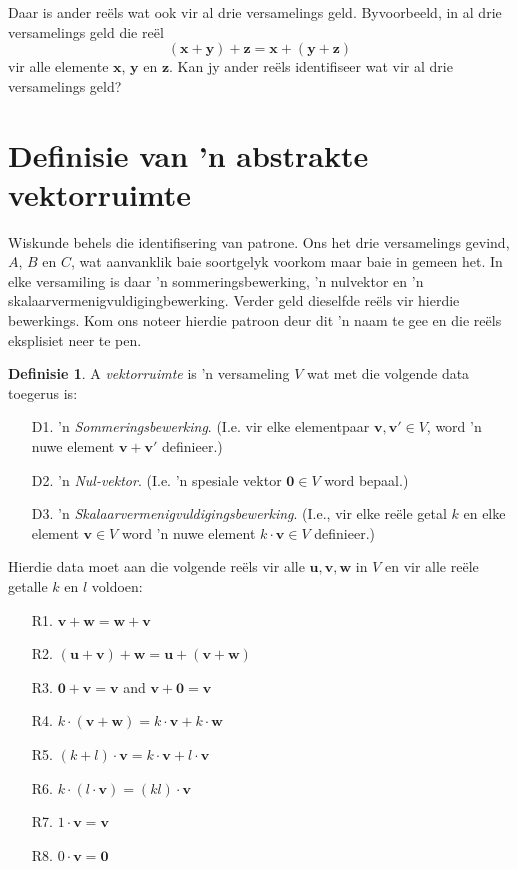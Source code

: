 \documentclass[a4paper,11pt]{book}
\theoremstyle{definition}
\newtheorem{definition}[theorem]{Definisie}
\newcommand{\be}{\begin{equation}}
\newcommand{\ee}{\end{equation}}
\newcommand{\ve}[1]{\mathbf{#1}}
\begin{document}
Daar is ander re{\"e}ls wat ook vir al drie versamelings geld.
Byvoorbeeld, in al drie versamelings geld die re{\"e}l
\be
(\ve{x} + \ve{y}) + \ve{z} = \ve{x} + (\ve{y} + \ve{z})
\ee
vir alle elemente $\ve{x}$, $\ve{y}$ en $\ve{z}$. Kan jy ander re{\"e}ls
identifiseer wat vir al drie versamelings geld?

\section{Definisie van 'n abstrakte vektorruimte}  \label{ACh1Sec2DefVectorSpace}
Wiskunde behels die identifisering van patrone. Ons het drie versamelings
gevind, $A$, $B$ en $C$, wat aanvanklik baie soortgelyk voorkom maar baie
in gemeen het. In elke versamiling is daar 'n sommeringsbewerking, 'n
nulvektor en 'n skalaarvermenigvuldigingbewerking. Verder geld dieselfde
re{\"e}ls vir hierdie bewerkings. Kom ons noteer hierdie patroon deur dit
'n naam te gee en die re{\"e}ls eksplisiet neer te pen.

\begin{definition} A \emph{vektorruimte} is 'n versameling $V$ wat met die
	volgende data toegerus is: \label{defnvec}
	\begin{itemize}
		\item[D1.] 'n \emph{Sommeringsbewerking}.  (I.e. vir elke
			elementpaar $\ve{v}, \ve{v}' \in V$, word 'n nuwe element
			$\ve{v} + \ve{v}'$ definieer.)
		\item[D2.] 'n \emph{Nul-vektor}. (I.e. 'n spesiale vektor $\ve{0}
			\in V$ word bepaal.)
		\item[D3.] 'n \emph{ Skalaarvermenigvuldigingsbewerking}. (I.e.,
			vir elke re{\"e}le getal $k$ en elke element $\ve{v} \in V$
			word 'n nuwe element $k \cdot \ve{v} \in V$ definieer.)
	\end{itemize}

	Hierdie data moet aan die volgende re{\"e}ls vir alle $\ve{u}, \ve{v},
	\ve{w}$ in $V$ en vir alle re{\"e}le getalle $k$ en $l$ voldoen:
	\begin{enumerate}
		\item[R1.] $\ve{v} + \ve{w} = \ve{w} + \ve{v}$  \\
		\item[R2.] $(\ve{u} + \ve{v}) + \ve{w} = \ve{u} + (\ve{v} +
			\ve{w})$ \\
		\item[R3.] $\ve{0} + \ve{v} = \ve{v}$ and $\ve{v} + \ve{0} =
			\ve{v}$\\
		\item[R4.] $k \cdot (\ve{v} + \ve{w}) = k \cdot \ve{v} + k \cdot
			\ve{w}$
		\item[R5.] $(k + l) \cdot \ve{v} = k \cdot \ve{v} + l \cdot
			{\ve{v}}$
		\item[R6.] $k \cdot (l \cdot \ve{v}) = (kl) \cdot \ve{v}$
		\item[R7.] $1 \cdot \ve{v} = \ve{v}$
		\item[R8.] $0 \cdot \ve{v} = \ve{0}$
	\end{enumerate}
\end{definition}
\end{document}
